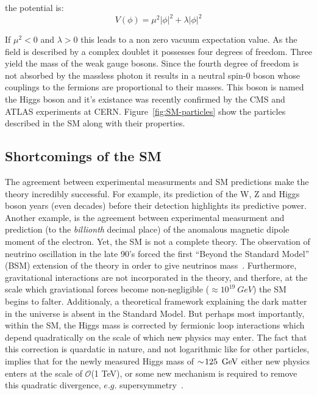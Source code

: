 the potential is:
\begin{equation}
\label{eq:higgs-potential}
V(\phi) = \mu^2|\phi|^2 + \lambda|\phi|^2
\end{equation}

If $\mu^2 < 0$ and $\lambda > 0$ this leads to a non zero vacuum expectation value. 
As the field is described by a complex doublet it possesses four degrees of freedom. 
Three yield the mass of the weak gauge bosons. Since the fourth degree of freedom is 
not absorbed by the massless photon it results in a neutral spin-0 boson whose couplings 
to the fermions are proportional to their masses. This boson is named the Higgs boson and
it's existance was recently confirmed by the CMS and ATLAS experiments at CERN.
Figure~\ref{fig:SM-particles} show the particles described in the SM along with their properties.

\subsection{Shortcomings of the SM}
The agreement between experimental measurments and SM predictions make
the theory incredibly successful. For example, its prediction of the W, Z and Higgs boson
years (even decades) before their detection highlights its
predictive power. Another example, is the agreement between experimental measurment 
and prediction (to the \textit{billionth} decimal place) of the anomalous magnetic dipole 
moment of the electron. Yet, the SM is not a complete theory. The observation of neutrino oscillation in 
the late 90's forced the first ``Beyond the Standard Model'' (BSM) 
extension of the theory in order to give neutrinos mass~\cite{zuber2003neutrino}. 
Furthermore, gravitational interactions are not incorporated in the theory,
and therfore, at the scale which graviational forces become non-negligible 
($\approx 10^19~GeV$) the SM begins to falter. Additionaly, a theoretical 
framework explaining the dark matter in the universe is absent in the Standard Model.
But perhaps most importantly, within the SM, the Higgs mass is corrected by fermionic
loop interactions which depend quadratically on the scale of which new physics may enter.
The fact that this correction is quardatic in nature, and not logarithmic like for 
other particles, implies that for the newly measured Higgs mass of $\sim\!125~\,\text{Ge\hspace{-.08em}V}$
either new physics enters at the scale of $\mathcal{O}$(1 TeV), or some new
mechanism is required to remove this quadratic divergence, $e.g.$ supersymmetry~\cite{Martin:1997ns}.

